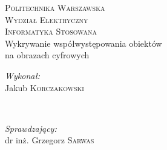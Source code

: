 \documentclass[a4paper,11pt, notitlepage, twosides, openany ]{report}
\begin{document}
	
	\begin{titlepage}
		
		\newcommand{\HRule}{\rule{\linewidth}{0.5mm}} %
		
		\center %
		
		
		\textsc{\LARGE Politechnika Warszawska}\\[1.5cm] %
		\textsc{\Large Wydział Elektryczny }\\[0.5cm] %
		\textsc{\large Informatyka Stosowana }\\[1.0cm] %
		
		
		{ \huge Wykrywanie współwystępowania obiektów\\ na obrazach cyfrowych}\\[2.0cm] %
		
		
		\begin{minipage}{0.4\textwidth}
			\begin{flushleft} \large
				\emph{Wykonał:}\\
			    Jakub \textsc{Korczakowski}\\
			\end{flushleft}
		\end{minipage}
		~
		\begin{minipage}{0.4\textwidth}
			\begin{flushright} \large
				\emph{Sprawdzający:} \\
				dr inż. Grzegorz \textsc{Sarwas} %
			\end{flushright}
		\end{minipage}\\[2cm]
		

\end{titlepage}
\end{document}
